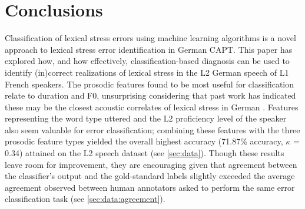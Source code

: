 \documentclass[a4paper]{article}
\begin{document}
	


		
		

	\section{Conclusions}
	\label{sec:conc}
	
		Classification of lexical stress errors using machine learning algorithms is a novel approach to lexical stress error identification in German CAPT.
		This paper has 
		explored  
		how, and how effectively, classification-based diagnosis can be used to identify (in)correct realizations of lexical stress in the L2 German speech of L1 French speakers. 
		The prosodic features found to be most useful for classification relate to duration and F0, unsurprising considering that past work has indicated these may be the closest acoustic correlates of lexical stress in German \cite{Cutler2005,Dogil1999}. 
		Features representing the word type uttered and the L2 proficiency level of the speaker also seem valuable for error classification; combining these features with the three prosodic feature types yielded the overall highest accuracy (71.87\% accuracy, $\kappa$ = 0.34) attained on the L2 speech dataset (see \cref{sec:data}).
		Though these results leave room for improvement, they are encouraging given that agreement between the classifier's output and the gold-standard labels slightly exceeded the average agreement observed between human annotators asked to perform the same error classification task (see \cref{sec:data:agreement}).
\end{document}
